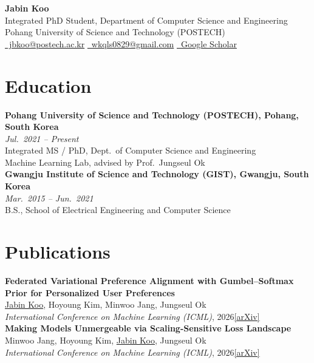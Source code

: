 \documentclass[11pt,a4paper]{article}
\newcommand{\pub}[5]{%
  \textbf{#1}\\
  #2\\
  \textit{#3}, #4\quad\href{#5}{[arXiv]}\\[4pt]
}
\begin{document}
\begin{center}
  {\Huge\bfseries Jabin Koo}\\[4pt]
  {Integrated PhD Student, Department of Computer Science and Engineering}\\
  {Pohang University of Science and Technology (POSTECH)}\\[4pt]
  \href{mailto:jbkoo@postech.ac.kr}{\faEnvelope\ jbkoo@postech.ac.kr}
  \quad\textbar\quad
  \href{mailto:wkqls0829@gmail.com}{\faEnvelope[regular]\ wkqls0829@gmail.com}
  \quad\textbar\quad
  \href{https://scholar.google.com/citations?user=W8SHg2IAAAAJ}{\faGraduationCap\ Google Scholar}
\end{center}

\section*{Education}

\textbf{Pohang University of Science and Technology (POSTECH), Pohang, South Korea} \hfill \\ \textit{Jul.\ 2021 -- Present}\\
Integrated MS / PhD, Dept.\ of Computer Science and Engineering\\
Machine Learning Lab, advised by Prof.\ Jungseul Ok\\[4pt]

\textbf{Gwangju Institute of Science and Technology (GIST), Gwangju, South Korea} \hfill \\ \textit{Mar.\ 2015 -- Jun.\ 2021} \\
B.S., School of Electrical Engineering and Computer Science \\ [4pt]

\section*{Publications}

\pub{Federated Variational Preference Alignment with Gumbel--Softmax Prior for Personalized User Preferences}
{\underline{Jabin Koo}, Hoyoung Kim, Minwoo Jang, Jungseul Ok}
{International Conference on Machine Learning (ICML)}{2026}
{https://arxiv.org/abs/2605.30873}

\pub{Making Models Unmergeable via Scaling-Sensitive Loss Landscape}
{Minwoo Jang, Hoyoung Kim, \underline{Jabin Koo}, Jungseul Ok}
{International Conference on Machine Learning (ICML)}{2026}
{https://arxiv.org/abs/2601.21898}
\end{document}
